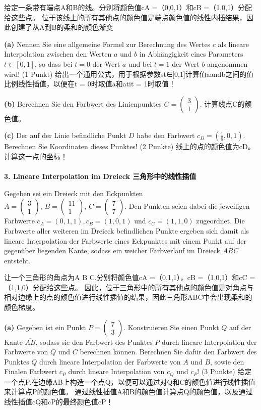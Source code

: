 \documentclass[fleqn]{article}
\begin{document}
给定一条带有端点A和B的线。分别将颜色值cA =（0,0,1）和cB =（1,0,1）分配给这些点。 位于该线上的所有其他点的颜色值是端点颜色值的线性内插结果，因此创建了从A到B的柔和的颜色渐变

\indent\textbf{(a)} Nennen Sie eine allgemeine Formel zur Berechnung des Wertes $c$ als lineare Interpolation zwischen den Werten $a$ und $b$ in Abhängigkeit eines Parameters $t\in [0, 1]$, so dass bei $t = 0$ der Wert $a$ und bei $t = 1$ der Wert $b$ angenommen wird! (1 Punkt)
给出一个通用公式，用于根据参数st∈[0,1]计算值aandb之间的值比例线性插值，以便在t = 0时取值a和atit = 1时取值！

\indent\textbf{(b)} Berechnen Sie den Farbwert des Linienpunktes $C=\begin{pmatrix}
    3\\1
\end{pmatrix}$. 计算线点C的颜色值。

\indent\textbf{(c)} Der auf der Linie befindliche Punkt $D$ habe den Farbwert $c_D = (\frac{1}{6},0,1)$. Berechnen Sie Koordinaten dieses Punktes! (2 Punkte)
线上的点的颜色值为cD。 计算这一点的坐标！
\\
\\
\noindent\textbf{3. Lineare Interpolation im Dreieck 三角形中的线性插值}

Gegeben sei ein Dreieck mit den Eckpunkten $A=\begin{pmatrix}
    3\\1
\end{pmatrix},\,B=\begin{pmatrix}
    11\\1
\end{pmatrix},\,C=\begin{pmatrix}
    7\\7
\end{pmatrix}$. Den Punkten seien dabei die jeweiligen Farbwerte $c_A = (0, 1, 1), c_B = (1, 0, 1)$ und $c_C = (1, 1, 0)$ zugeordnet.
 Die Farbwerte aller weiteren im Dreieck befindlichen Punkte ergeben sich damit als lineare Interpolation der Farbwerte eines Eckpunktes mit einem Punkt auf der gegenüber liegenden Kante, sodass ein weicher Farbverlauf im Dreieck \textit{ABC} entsteht.

让一个三角形的角点为A B C.分别将颜色值cA =（0,1,1），cB =（1,0,1）和cC =（1,1,0）分配给这些点。 因此，位于三角形中的所有其他点的颜色值是对角点与相对边缘上的点的颜色值进行线性插值的结果，因此三角形ABC中会出现柔和的颜色梯度。

\indent\textbf{(a)} Gegeben ist ein Punkt $P=\begin{pmatrix}
    7\\3
\end{pmatrix}$. Konstruieren Sie einen Punkt $Q$ auf der Kante $\overline{AB}$, sodass sie den Farbwert des Punktes $P$ durch lineare Interpolation der Farbwerte von $Q$ und $C$ berechnen können. Berechnen Sie dafür den Farbwert des Punktes $Q$ durch lineare Interpolation der Farbwerte von $A$ und $B$, sowie den Finalen Farbwert $c_P$ durch lineare Interpolation von $c_Q$ und $c_P$! (3 Punkte)
给定一个点P.在边缘AB上构造一个点Q，以便可以通过对Q和C的颜色值进行线性插值来计算点P的颜色值。 通过线性插值A和B的颜色值计算点Q的颜色值，以及通过线性插值cQ和cP的最终颜色值cP！
\end{document}
